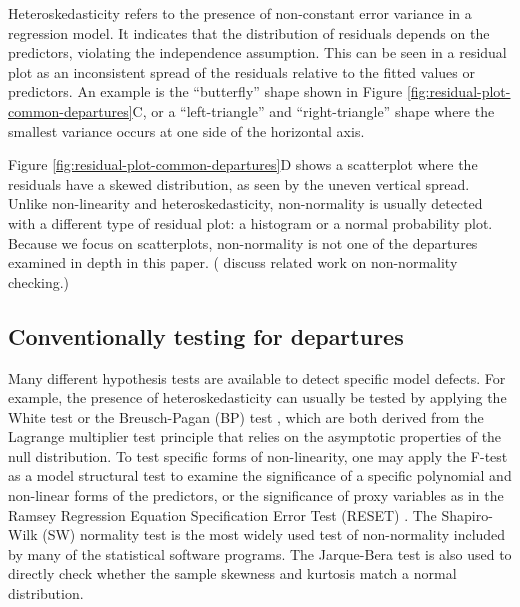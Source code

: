 \documentclass[]{interact}
\theoremstyle{plain}%
\theoremstyle{definition}
\theoremstyle{remark}
\begin{document}
Heteroskedasticity refers to the presence of non-constant error variance
in a regression model. It indicates that the distribution of residuals
depends on the predictors, violating the independence assumption. This
can be seen in a residual plot as an inconsistent spread of the
residuals relative to the fitted values or predictors. An example is the
``butterfly'' shape shown in Figure
\ref{fig:residual-plot-common-departures}C, or a ``left-triangle'' and
``right-triangle'' shape where the smallest variance occurs at one side
of the horizontal axis.

Figure \ref{fig:residual-plot-common-departures}D shows a scatterplot
where the residuals have a skewed distribution, as seen by the uneven
vertical spread. Unlike non-linearity and heteroskedasticity,
non-normality is usually detected with a different type of residual
plot: a histogram or a normal probability plot. Because we focus on
scatterplots, non-normality is not one of the departures examined in
depth in this paper. (\citet{loy2016variations} discuss related work on
non-normality checking.)

\hypertarget{conventionally-testing-for-departures}{%
\subsection{Conventionally testing for
departures}\label{conventionally-testing-for-departures}}

Many different hypothesis tests are available to detect specific model
defects. For example, the presence of heteroskedasticity can usually be
tested by applying the White test \citep{white1980heteroskedasticity} or
the Breusch-Pagan (BP) test \citep{breusch1979simple}, which are both
derived from the Lagrange multiplier test \citep{silvey1959lagrangian}
principle that relies on the asymptotic properties of the null
distribution. To test specific forms of non-linearity, one may apply the
F-test as a model structural test to examine the significance of a
specific polynomial and non-linear forms of the predictors, or the
significance of proxy variables as in the Ramsey Regression Equation
Specification Error Test (RESET) \citep{ramsey1969tests}. The
Shapiro-Wilk (SW) normality test \citep{shapiro1965analysis} is the most
widely used test of non-normality included by many of the statistical
software programs. The Jarque-Bera test \citep{jarque1980efficient} is
also used to directly check whether the sample skewness and kurtosis
match a normal distribution.
\end{document}
